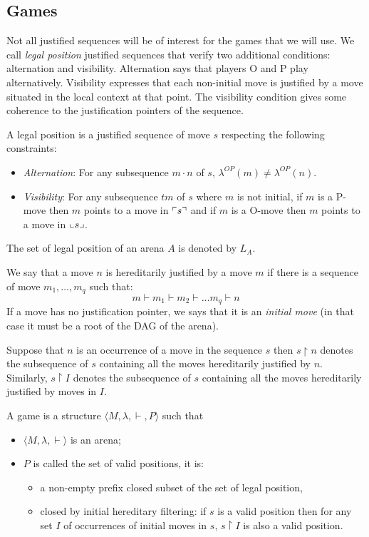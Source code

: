 \subsection{Games}

Not all justified sequences will be of interest for the
games that we will use. We call \emph{legal position} justified
sequences that verify two additional conditions: alternation and
visibility. Alternation says that players O and P play
alternatively. Visibility expresses that each non-initial move is
justified by a move situated in the local context at that point.
The visibility condition gives some coherence to the
justification pointers of the sequence.

\begin{dfn}
A legal position is a justified sequence of move $s$ respecting the following constraints:
\begin{itemize}
\item \emph{Alternation}: For any subsequence $m \cdot n$ of $s$, $\lambda^{OP}(m) \neq \lambda^{OP}(n)$.
\item \emph{Visibility}: For any subsequence $t m$ of $s$ where $m$ is not initial, if $m$ is a P-move then $m$ points to a move in $\ulcorner s \urcorner$
and if $m$ is a O-move then $m$ points to a move in $\llcorner s \lrcorner$.
\end{itemize}
The set of legal position of an arena $A$ is denoted by $L_A$.
\end{dfn}

We say that a move $n$ is hereditarily justified by a move $m$ if there is a sequence of move
$m_1, \ldots, m_q$ such that:
$$ m \vdash m_1 \vdash m_2 \vdash \ldots m_q \vdash n$$
If a move has no justification pointer, we says that it is an
\emph{initial move} (in that case it must be a root of the DAG of the arena).

Suppose that $n$ is an occurrence of a move in the sequence $s$ then
$s \upharpoonright n$ denotes the subsequence of $s$ containing all
the moves hereditarily justified by $n$. Similarly, $s
\upharpoonright I$ denotes the subsequence of $s$ containing all the
moves hereditarily justified by moves in $I$.

\begin{dfn}[Game]
A game is a structure $\langle M, \lambda, \vdash, P \rangle$ such that
\begin{itemize}
\item $ \langle M, \lambda, \vdash \rangle$ is an arena;
\item $P$ is called the set of valid positions, it is:
    \begin{itemize}
    \item a non-empty prefix closed subset of the set of legal
    position,
    \item closed by initial hereditary filtering: if $s$ is a valid position then for any set $I$ of occurrences of initial moves
    in $s$, $s\upharpoonright I$ is also a valid position.
    \end{itemize}
\end{itemize}
\end{dfn}

